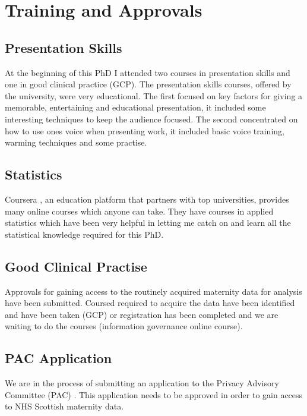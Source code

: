 \documentclass[bsc]{abdnthesis}
\begin{document}
\chapter{Training and Approvals}
\section{Presentation Skills} %
\label{sec:presentation_skills}
At the beginning of this PhD I attended two courses in presentation skills and one in good clinical practice (GCP). The presentation skills courses, offered by the university, were very educational. The first focused on key factors for giving a memorable, entertaining and educational presentation, it included some interesting techniques to keep the audience focused. The second concentrated on how to use ones voice when presenting work, it included basic voice training, warming techniques and some practise. 
\section{Statistics} %
\label{sec:statistics}
Coursera \cite{coursera}, an education platform that partners with top universities, provides many online courses which anyone can take. They have courses in applied statistics which have been very helpful in letting me catch on and learn all the statistical knowledge required for this PhD. 
\section{Good Clinical Practise} %
\label{sec:good_clinical_practise}
Approvals for gaining access to the routinely acquired maternity data for analysis have been submitted. Coursed required to acquire the data have been identified and have been taken (GCP) or registration has been completed and we are waiting to do the courses (information governance online course).
\section{PAC Application} %
\label{sec:pac_application}
We are in the process of submitting an application to the Privacy Advisory Committee (PAC) \cite{pac}. This application needs to be approved in order to gain access to NHS Scottish  maternity data. 
\end{document}
